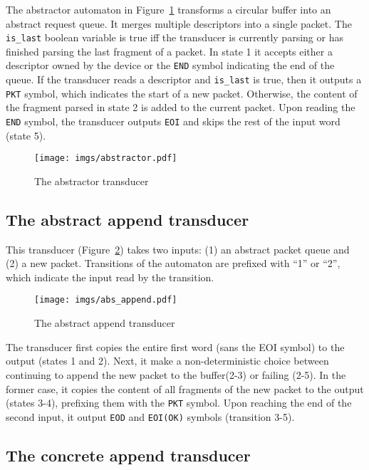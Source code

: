 \documentclass{article}
\begin{document}
The abstractor automaton in Figure~\ref{f:abstractor} transforms a 
circular buffer into an abstract request queue.  It merges 
multiple descriptors into a single packet.  The \texttt{is\_last} 
boolean variable is true iff the transducer is currently parsing 
or has finished parsing the last fragment of a packet.  In state 1 
it accepts either a descriptor owned by the device or the 
\texttt{END} symbol indicating the end of the queue.  If the 
transducer reads a descriptor and \texttt{is\_last} is true, then 
it outputs a \texttt{PKT} symbol, which indicates the start of a 
new packet.  Otherwise, the content of the fragment parsed in 
state 2 is added to the current packet.  Upon reading the 
\texttt{END} symbol, the transducer outputs \texttt{EOI} and skips 
the rest of the input word (state 5).

\begin{figure}[t]
    \center
    \texttt{[image: imgs/abstractor.pdf]}
    \caption{The abstractor transducer}\label{f:abstractor}
\end{figure}


\subsection{The abstract append transducer}
 
This transducer (Figure~\ref{f:abs_append}) takes two inputs: (1) 
an abstract packet queue and (2) a new packet.  Transitions of the 
automaton are prefixed with ``1'' or ``2'', which indicate the 
input read by the transition.

\begin{figure}[t]
    \center
    \texttt{[image: imgs/abs\_append.pdf]}
    \caption{The abstract append transducer}\label{f:abs_append}
\end{figure}


The transducer first copies the entire first word (sans the EOI 
symbol) to the output (states 1 and 2).  Next, it make a 
non-deterministic choice between continuing to append the new 
packet to the buffer(2-3) or failing (2-5).  In the former case, 
it copies the content of all fragments of the new packet to the 
output (states 3-4), prefixing them with the \texttt{PKT} symbol.  
Upon reaching the end of the second input, it output \texttt{EOD} 
and \texttt{EOI(OK)} symbols (transition 3-5).

\subsection{The concrete append transducer}
\end{document}
